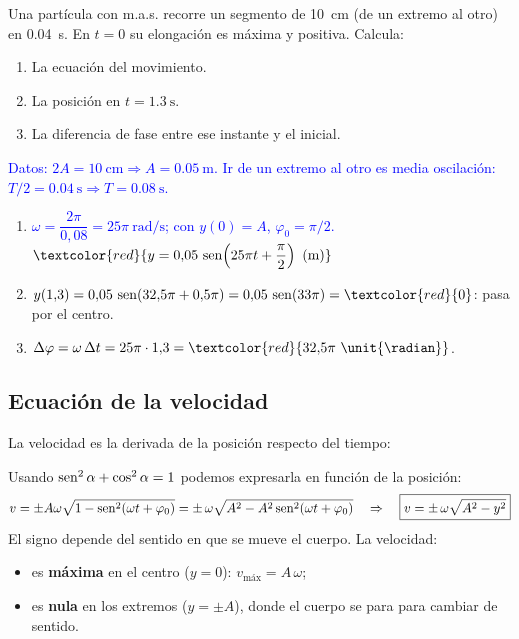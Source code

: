 \begin{exercise}
    Una partícula con m.a.s. recorre un segmento de \qty{10}{\cm} (de un extremo al otro) en \qty{0.04}{\second}. En \(t = 0\)
    su elongación es máxima y positiva. Calcula:
    \begin{enumerate}[label=\letraminuscula]
        \item La ecuación del movimiento.
        \item La posición en \(t = \qty{1.3}{\second}\).
        \item La diferencia de fase entre ese instante y el inicial.
    \end{enumerate}
    \begin{solu}
        \textcolor{blue}{Datos: \(2A = \qty{10}{\cm} \Rightarrow A = \qty{0.05}{\m}\). Ir de un extremo al otro es media
        oscilación: \(T/2 = \qty{0.04}{\second} \Rightarrow T = \qty{0.08}{\second}\).}
        \begin{enumerate}[label=\letraminuscula]
            \item \textcolor{blue}{\(\omega = \dfrac{2\pi}{0{,}08} = 25\pi\ \unit{\radian\per\second}\); con \(y(0) = A\), \(\varphi_0 = \pi/2\).}
            \(\textcolor{red}{y = 0{,}05\,\sen\!\left(25\pi t + \dfrac{\pi}{2}\right)\ \text{(m)}}\)
            \item \(y(1{,}3) = 0{,}05\,\sen(32{,}5\pi + 0{,}5\pi) = 0{,}05\,\sen(33\pi) = \textcolor{red}{0}\): pasa por el centro.
            \item \(\Delta\varphi = \omega\,\Delta t = 25\pi\cdot 1{,}3 = \textcolor{red}{32{,}5\pi\ \unit{\radian}}\).
        \end{enumerate}
    \end{solu}
\end{exercise}

\subsection{Ecuación de la velocidad}\label{subsec:mas-velocidad}

La velocidad es la derivada de la posición respecto del tiempo:
\begin{centeredequation}
     \label{eq:mas-velocidad}
\end{centeredequation}

Usando \(\operatorname{sen}^2\alpha + \cos^2\alpha = 1\) podemos expresarla en función de la posición:
\begin{equation*}
    v = \pm A\omega\sqrt{1 - \operatorname{sen}^2(\omega t + \varphi_0)} = \pm\,\omega\sqrt{A^2 - A^2\operatorname{sen}^2(\omega t + \varphi_0)}
    \quad\Rightarrow\quad \boxed{v = \pm\,\omega\sqrt{A^2 - y^2}}
\end{equation*}
El signo depende del sentido en que se mueve el cuerpo. La velocidad:
\begin{itemize}
    \item es \textbf{máxima} en el centro (\(y = 0\)): \(v_{\text{máx}} = A\,\omega\);
    \item es \textbf{nula} en los extremos (\(y = \pm A\)), donde el cuerpo se para para cambiar de sentido.
\end{itemize}

